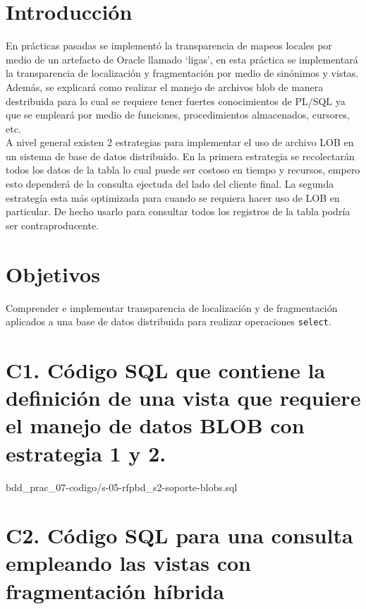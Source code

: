 \documentclass{article}
\newcommand{\codedir}{bdd_prac_07-codigo}
\begin{document}
\newpage

\section*{Introducción}

En prácticas pasadas se implementó la transparencia de mapeos locales por 
medio de un artefacto de Oracle llamado `ligas', en esta práctica se 
implementará la transparencia de localización y fragmentación por medio de
sinónimos y vistas. Además, se explicará como realizar el manejo de archivos
blob de manera destribuida para lo cual se requiere tener fuertes conocimientos
de PL/SQL ya que se empleará por medio de funciones, procedimientos 
almacenados, cursores, etc.\\

A nivel general existen 2 estrategias para implementar el uso de archivo LOB
en un sistema de base de datos distribuido. En la primera estrategia se 
recolectarán todos los datos de la tabla lo cual puede ser costoso en tiempo
y recursos, empero esto dependerá de la consulta ejectuda del lado del cliente
final. La segunda estrategía esta más optimizada para cuando se requiera
hacer uso de LOB en particular. De hecho usarlo para consultar todos los 
registros de la tabla podría ser contraproducente.

\section*{Objetivos}

Comprender e implementar transparencia de localización y de fragmentación 
aplicados a una base de datos distribuida para realizar operaciones
\texttt{select}.

\section*{C1. Código SQL que contiene la definición de una vista que requiere 
  el manejo de datos BLOB con estrategia 1 y 2.}

  
  {\codedir/s-05-rfpbd_s2-soporte-blobs.sql}

\section*{C2. Código SQL para una consulta empleando las vistas con 
  fragmentación híbrida }
\end{document}
